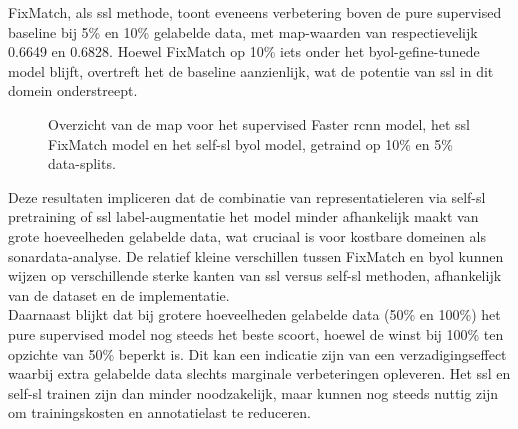 FixMatch, als \gls{ssl} methode, toont eveneens verbetering boven de pure supervised baseline bij 5\% en 10\% gelabelde data, met \gls{map}-waarden van respectievelijk 0.6649 en 0.6828. Hoewel FixMatch op 10\% iets onder het \gls{byol}-gefine-tunede model blijft, overtreft het de baseline aanzienlijk, wat de potentie van \gls{ssl} in dit domein onderstreept.

\begin{figure}[H]
    \centering
    \caption[Vergelijking van mAP tussen semi- en self-supervised modellen.]{\label{fig:map_performance_research_models}Overzicht van de \gls{map} voor het supervised Faster \gls{rcnn} model, het \gls{ssl} FixMatch model en het \gls{self-sl} \gls{byol} model, getraind op 10\% en 5\% data-splits.}
\end{figure}

Deze resultaten impliceren dat de combinatie van representatieleren via \gls{self-sl} pretraining of \gls{ssl} label-augmentatie het model minder afhankelijk maakt van grote hoeveelheden gelabelde data, wat cruciaal is voor kostbare domeinen als sonardata-analyse. De relatief kleine verschillen tussen FixMatch en \gls{byol} kunnen wijzen op verschillende sterke kanten van \gls{ssl} versus \gls{self-sl} methoden, afhankelijk van de dataset en de implementatie. \\

Daarnaast blijkt dat bij grotere hoeveelheden gelabelde data (50\% en 100\%) het pure supervised model nog steeds het beste scoort, hoewel de winst bij 100\% ten opzichte van 50\% beperkt is. Dit kan een indicatie zijn van een verzadigingseffect waarbij extra gelabelde data slechts marginale verbeteringen opleveren. Het \gls{ssl} en \gls{self-sl} trainen zijn dan minder noodzakelijk, maar kunnen nog steeds nuttig zijn om trainingskosten en annotatielast te reduceren.

